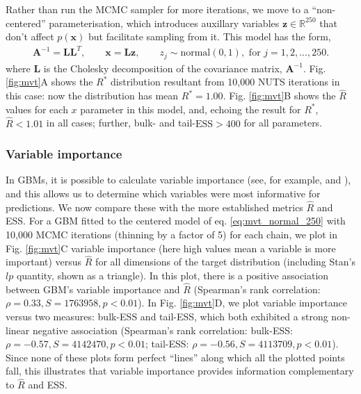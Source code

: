 \documentclass{article}
\begin{document}
Rather than run the MCMC sampler for more iterations, we move to a ``non-centered'' parameterisation, which introduces auxillary variables $\boldsymbol{z}\in\mathbb{R}^{250}$ that don't affect $p(\boldsymbol{x})$ but facilitate sampling from it. This model has the form,
%
\begin{align}
\boldsymbol{A}^{-1} = \boldsymbol{L}\boldsymbol{L}^T,\qquad
\boldsymbol{x} = \boldsymbol{L} \boldsymbol{z},\qquad
z_j\sim \text{normal}(0, 1), \text{ for } j = 1,2,...,250.
\end{align}
%
where $\boldsymbol{L}$ is the Cholesky decomposition of the covariance matrix, $\boldsymbol{A}^{-1}$. Fig. \ref{fig:mvt}A shows the $R^*$ distribution resultant from 10,000 NUTS iterations in this case: now the distribution has mean $R^*=1.00$. Fig. \ref{fig:mvt}B shows the $\widehat{R}$ values for each $x$ parameter in this model, and, echoing the result for $R^*$, $\widehat{R}<1.01$ in all cases; further, bulk- and tail-$\text{ESS}>400$ for all parameters.

\subsubsection{Variable importance}\label{sec:multivariate_normal_varimportance}
In GBMs, it is possible to calculate variable importance (see, for example, \cite{friedman2001greedy} and \cite{greenwell2019package}), and this allows us to determine which variables were most informative for predictions. We now compare these with the more established metrics $\widehat{R}$ and ESS. For a GBM fitted to the centered model of eq. \eqref{eq:mvt_normal_250} with 10,000 MCMC iterations (thinning by a factor of 5) for each chain, we plot in Fig. \ref{fig:mvt}C variable importance (here high values mean a variable is more important) versus $\widehat{R}$ for all dimensions of the target distribution (including Stan's $lp$ quantity, shown as a triangle). In this plot, there is a positive association between GBM's variable importance and $\widehat{R}$ (Spearman's rank correlation: $\rho=0.33, S=1763958, p<0.01$). In Fig.  \ref{fig:mvt}D, we plot variable importance versus two measures: bulk-ESS and tail-ESS, which both exhibited a strong non-linear negative association (Spearman's rank correlation: bulk-ESS: $\rho=-0.57, S=4142470, p<0.01$; tail-ESS: $\rho=-0.56, S=4113709, p<0.01$). Since none of these plots form perfect ``lines'' along which all the plotted points fall, this illustrates that variable importance provides information complementary to $\widehat{R}$ and ESS.
\end{document}
